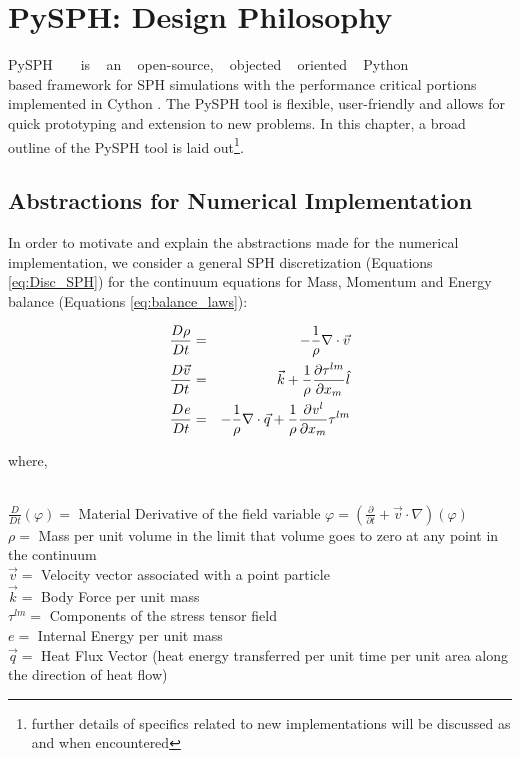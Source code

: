 \chapter{PySPH: Design Philosophy}

PySPH ~\cite{prabhu_puri} ~ is ~ an ~ open-source, ~ objected ~ oriented ~ Python\\ \cite{python} based framework for SPH simulations with the performance critical portions implemented in Cython \cite{cython}. The PySPH tool is flexible, user-friendly and allows for quick prototyping and extension to new problems. In this chapter, a broad outline of the PySPH tool is laid out\footnote[4]{further details of specifics related to new implementations will be discussed as and when encountered}.

\section{Abstractions for Numerical Implementation} \label{sec:pysph_abstractions}

In order to motivate and explain the abstractions made for the numerical implementation, we consider a general SPH discretization (Equations \eqref{eq:Disc_SPH}) for the continuum equations for Mass, Momentum and Energy balance (Equations \eqref{eq:balance_laws}):

\begin{eqnarray} \label{eq:balance_laws}
\frac{D\rho}{Dt} &=& -\frac{1}{\rho} \nabla \cdot \vec{v} \nonumber \\
\frac{D{\vec{v}}}{Dt}&=&\vec{k} + \frac{1}{\rho} \frac{\partial \tau^{lm}}{\partial x_m} \hat{l} \\
\frac{D{\it{e}}}{Dt}&=& -\frac{1}{\rho}\nabla \cdot \vec{q} + \frac{1}{\rho}\frac{\partial {\it{v}^{l}} }{\partial x_m}\tau^{lm} \nonumber
\end{eqnarray}

{\raggedright{where,}}\\
$\frac{D}{Dt}(\varphi) = $ Material Derivative of the field variable $\varphi = \left(\frac{\partial}{\partial t} + \vec{v}\cdot\nabla\right)(\varphi)$ \\
$\rho = $ Mass per unit volume in the limit that volume goes to zero at any point in the continuum\\
$\vec{v} = $ Velocity vector associated with a point particle\\
$\vec{k} = $ Body Force per unit mass\\
$\tau^{lm} = $ Components of the stress tensor field\\
$e = $ Internal Energy per unit mass\\
$\vec{q} = $ Heat Flux Vector (heat energy transferred per unit time per unit area along the direction of heat flow) 

